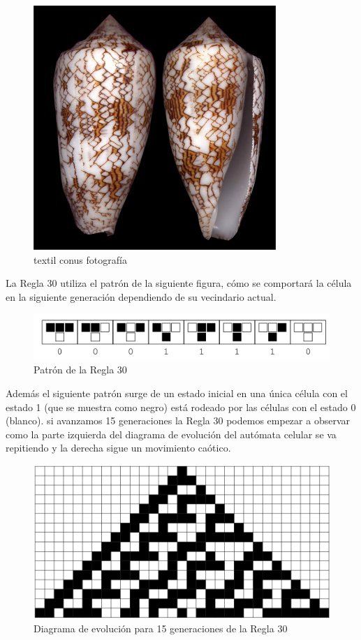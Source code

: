\begin{figure}[H]
\centering
\includegraphics[scale=0.7]{imagenes/concha.jpg}
\caption{textil conus fotografía}
\end{figure}


La Regla 30 utiliza el patrón de la siguiente figura, cómo se comportará la célula en la siguiente generación dependiendo de su vecindario actual.

\begin{figure}[H]
\centering
\includegraphics[scale=0.7]{imagenes/rule_30_1.png}
\caption{Patrón de la Regla 30}
\end{figure}

Además el siguiente patrón surge de un estado inicial en una única célula con el estado 1 (que se muestra como negro) está rodeado por las células con el estado 0 (blanco). si avanzamos 15 generaciones la Regla 30 podemos empezar a observar como la parte izquierda del diagrama de evolución del autómata celular se va repitiendo y la derecha sigue un movimiento caótico.

\begin{figure}[H]
\centering
\includegraphics[scale=0.7]{imagenes/rule_30_2.png}
\caption{Diagrama de evolución para 15 generaciones de la Regla 30}
\end{figure}

